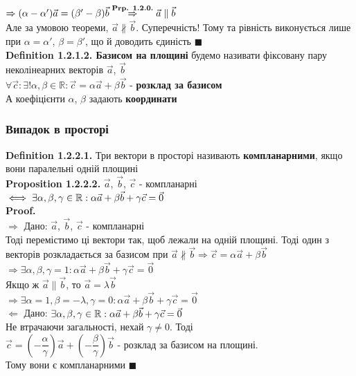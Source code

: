 \documentclass[a4paper, 14pt]{extarticle}
\def\defin#1{\textbf{Definition {#1}}}
\def\prp#1{\textbf{Proposition {#1}}}
\def\proof{\textbf{Proof.}\\}
\def\bigline{\vspace{5mm}\\}
\def\qed{$\blacksquare$}
\begin{document}
	$\Rightarrow (\alpha-\alpha')\vec{a} = (\beta' - \beta)\vec{b} \overset{\textrm{\textbf{Prp. 1.2.0.}}}{\Rightarrow} \vec{a} \parallel \vec{b}$\\
	Але за умовою теореми, $\vec{a} \not\parallel \vec{b}$. Суперечність! Тому та рівність виконується лише при $\alpha = \alpha'$, $\beta = \beta'$, що й доводить єдиність \qed
	\bigline
	\defin{1.2.1.2. Базисом на площині} будемо називати фіксовану пару неколінеарних векторів $\vec{a}$, $\vec{b}$\\
	$\forall \vec{c}: \exists! \alpha, \beta \in \mathbb{R}: \vec{c} = \alpha \vec{a} + \beta \vec{b}$ - \textbf{розклад за базисом}\\
	А коефіцієнти $\alpha$, $\beta$ задають \textbf{координати}\\
	
	\subsubsection{Випадок в просторі}
	\defin{1.2.2.1.} Три вектори в просторі називають \textbf{компланарними}, якщо вони паралельні одній площині
	\bigline
	\prp{1.2.2.2.} $\vec{a}$, $\vec{b}$, $\vec{c}$ - компланарні $\iff \exists \alpha, \beta, \gamma \in \mathbb{R}: \\ \alpha \vec{a} + \beta \vec{b} + \gamma \vec{c} = \vec{0}$\\
	\proof
	$\boxed{\Rightarrow}$ Дано: $\vec{a}$, $\vec{b}$, $\vec{c}$ - компланарні\\
	Тоді перемістимо ці вектори так, щоб лежали на одній площині. Тоді один з векторів розкладається за базисом при $\vec{a} \not\parallel \vec{b} \Rightarrow \vec{c} = \alpha \vec{a} + \beta \vec{b}$\\
	$\Rightarrow \exists \alpha, \beta, \gamma = 1: \alpha \vec{a} + \beta \vec{b} + \gamma \vec{c} = \vec{0}$\\
	Якщо ж $\vec{a} \parallel \vec{b}$, то $\vec{a} = \lambda \vec{b}$\\
	$\Rightarrow \exists \alpha = 1, \beta = -\lambda, \gamma = 0: \alpha \vec{a} + \beta \vec{b} + \gamma \vec{c} = \vec{0}$
	\bigline
	$\boxed{\Leftarrow}$ Дано: $\exists \alpha, \beta, \gamma \in \mathbb{R}: \\ \alpha \vec{a} + \beta \vec{b} + \gamma \vec{c} = \vec{0}$\\
	Не втрачаючи загальності, нехай $\gamma \neq 0$. Тоді\\
	$\vec{c} = \left( -\dfrac{\alpha}{\gamma} \right) \vec{a} + \left( -\dfrac{\beta}{\gamma} \right) \vec{b}$ - розклад за базисом на площині. \\ Тому вони є компланарними \qed
\end{document}
